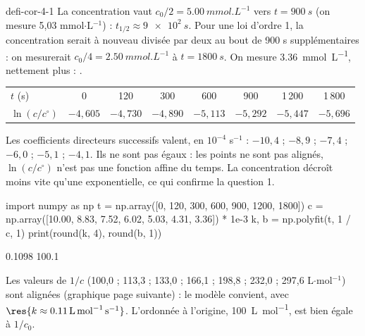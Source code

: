 \begin{blocEdition}{defi-cor-4-1}
La concentration vaut $c_0/2=\qty{5,00}{mmol.L^{-1}}$ vers $t=\qty{900}{s}$ (on mesure 5,03 mmol$\cdot$L$^{-1}$) :
$t_{1/2}\approx\qty{9e2}{s}$. Pour une loi d'ordre 1, la concentration serait à nouveau divisée par deux au bout de
900 s supplémentaires : on mesurerait $c_0/4=\qty{2,50}{mmol.L^{-1}}$ à $t=\qty{1800}{s}$. On mesure
\qty{3,36}{mmol.L^{-1}}, nettement plus : .
\begin{center}\small\renewcommand{\arraystretch}{1.2}
\begin{tabular}{@{}l*{7}{c}@{}}\toprule
$t$ (s) & 0 & 120 & 300 & 600 & 900 & 1\,200 & 1\,800\\
$\ln(c/c^\circ)$ & $-4{,}605$ & $-4{,}730$ & $-4{,}890$ & $-5{,}113$ & $-5{,}292$ & $-5{,}447$ & $-5{,}696$\\\bottomrule
\end{tabular}\end{center}
Les coefficients directeurs successifs valent, en $10^{-4}$ s$^{-1}$ : $-10{,}4$ ; $-8{,}9$ ; $-7{,}4$ ; $-6{,}0$ ; $-5{,}1$ ;
$-4{,}1$. Ils ne sont pas égaux : les points ne sont pas alignés, $\ln(c/c^\circ)$ n'est pas une fonction affine du
temps. La concentration décroît moins vite qu'une exponentielle, ce qui confirme la question 1.
\begin{codecote}[0.62]
\begin{pythoncol}
import numpy as np
t = np.array([0, 120, 300, 600, 900, 1200, 1800])
c = np.array([10.00, 8.83, 7.52, 6.02,
              5.03, 4.31, 3.36]) * 1e-3
k, b = np.polyfit(t, 1 / c, 1)
print(round(k, 4), round(b, 1))
\end{pythoncol}
\cote
\begin{consolecol}
0.1098 100.1
\end{consolecol}
\end{codecote}
Les valeurs de $1/c$ (100,0 ; 113,3 ; 133,0 ; 166,1 ; 198,8 ; 232,0 ; 297,6 L$\cdot$mol$^{-1}$) sont alignées
(graphique page suivante) : le modèle convient, avec $\res{k\approx\qty{0,11}{L.mol^{-1}.s^{-1}}}$. L'ordonnée à
l'origine, \qty{100}{L.mol^{-1}}, est bien égale à $1/c_0$.
\end{blocEdition}

